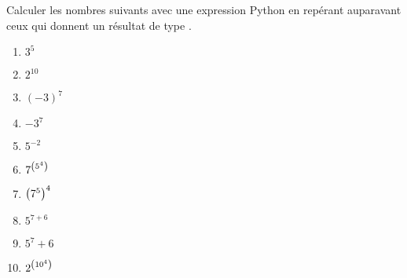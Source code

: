 Calculer les nombres suivants avec une expression Python en repérant auparavant ceux qui donnent un résultat de type .
\begin{multicols}{5}
  \begin{enumerate}[label=\emph{\alph*)}]
    \item $3^5$
    \item $2^{10}$
    \item $(-3)^7$
    \item $-3^7$
    \item $5^{-2}$
    \item $7^{\left(5^4\right)}$
    \item $\left(7^5\right)^4$
    \item $5^{7+6}$
    \item $5^7+6$
    \item $2^{\left(10^4\right)}$
  \end{enumerate}
\end{multicols}